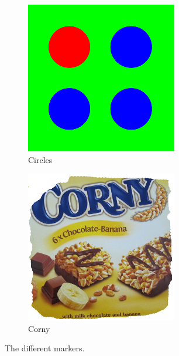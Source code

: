 \begin{figure}[h]
\begin{subfigure}[b]{0.3\linewidth}
 \includegraphics[width=\linewidth]{graphics/Marker1}
 \caption{Circles}
 \label{marker:circle}
 \end{subfigure}
 \begin{subfigure}[b]{0.3\linewidth}
 \centering
 \includegraphics[width=\linewidth]{graphics/Marker3}
 \caption{Corny}
 \label{marker:corny}
 \end{subfigure}
 \caption{The different markers.}
 \label{fig:markers}
\end{figure}
